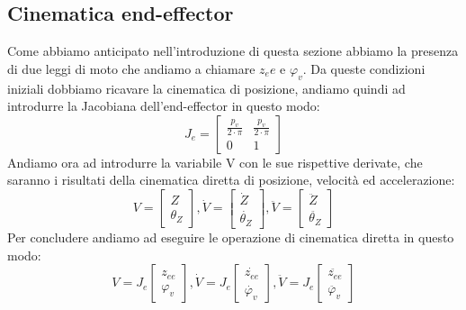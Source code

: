 \subsection{Cinematica end-effector}
Come abbiamo anticipato nell'introduzione di questa sezione abbiamo la presenza di due leggi di moto che andiamo a chiamare $z_ee$ e $\varphi_v$. Da queste condizioni iniziali dobbiamo ricavare la cinematica di posizione, andiamo quindi ad introdurre la Jacobiana dell'end-effector in questo modo: 
\begin{equation*}
J_e =
    \begin{bmatrix}
    \frac{p_v}{2\cdot \pi} & \frac{p_v}{2\cdot \pi} \\
    0 & 1
    \end{bmatrix}
\end{equation*}
Andiamo ora ad introdurre la variabile V con le sue rispettive derivate, che saranno i risultati della cinematica diretta di posizione, velocità ed accelerazione:
\begin{equation*}
    V = 
    \begin{bmatrix}
     Z \\ 
     \theta_Z
    \end{bmatrix}, 
    \dot{V} = 
    \begin{bmatrix}
    \dot{Z} \\ \dot{\theta_Z}
    \end{bmatrix},
    \ddot{V} =
    \begin{bmatrix}
    \ddot{Z} \\ \ddot{\theta_Z}
    \end{bmatrix}
\end{equation*}
Per concludere andiamo ad eseguire le operazione di cinematica diretta in questo modo:
\begin{equation}
    V = J_e \begin{bmatrix}
    z_{ee} \\ \varphi_v
    \end{bmatrix},
    \dot{V} = J_e \begin{bmatrix}
    \dot{z_{ee}} \\ \dot{\varphi_v}
    \end{bmatrix},
    \ddot{V} = J_e \begin{bmatrix}
    \ddot{z_{ee}} \\ \ddot{\varphi_v}
    \end{bmatrix}
\end{equation}

